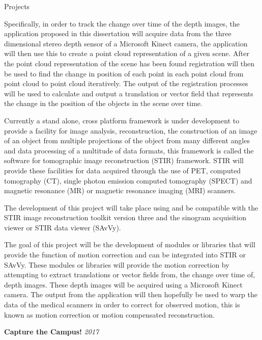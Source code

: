 \documentclass{cv}
\begin{document}
\begin{rSection}{Projects}
\item Specifically, in order to track the change over time of the depth images, the application proposed in this dissertation will acquire data from the three dimensional stereo depth sensor of a Microsoft Kinect camera, the application will then use this to create a point cloud representation of a given scene. After the point cloud representation of the scene has been found registration will then be used to find the change in position of each point in each point cloud from point cloud to point cloud iteratively. The output of the registration processes will be used to calculate and output a translation or vector field that represents the change in the position of the objects in the scene over time.

\item Currently a stand alone, cross platform framework is under development to provide a facility for image analysis, reconstruction, the construction of an image of an object from multiple projections of the object from many different angles and data processing of a multitude of data formats, this framework is called the software for tomographic image reconstruction (STIR) framework. STIR will provide these facilities for data acquired through the use of PET, computed tomography (CT), single photon emission computed tomography (SPECT) and magnetic resonance (MR) or magnetic resonance imaging (MRI) scanners.

\item The development of this project will take place using and be compatible with the STIR image reconstruction toolkit version three and the sinogram acquisition viewer or STIR data viewer (SAvVy).

\item The goal of this project will be the development of modules or libraries that will provide the function of motion correction and can be integrated into STIR or SAvVy. These modules or libraries will provide the motion correction by attempting to extract translations or vector fields from, the change over time of, depth images. These depth images will be acquired using a Microsoft Kinect camera. The output from the application will then hopefully be used to warp the data of the medical scanners in order to correct for observed motion, this is known as motion correction or motion compensated reconstruction.


{\bf Capture the Campus!} \hfill {\em 2017} 


\end{rSection}
\end{document}
